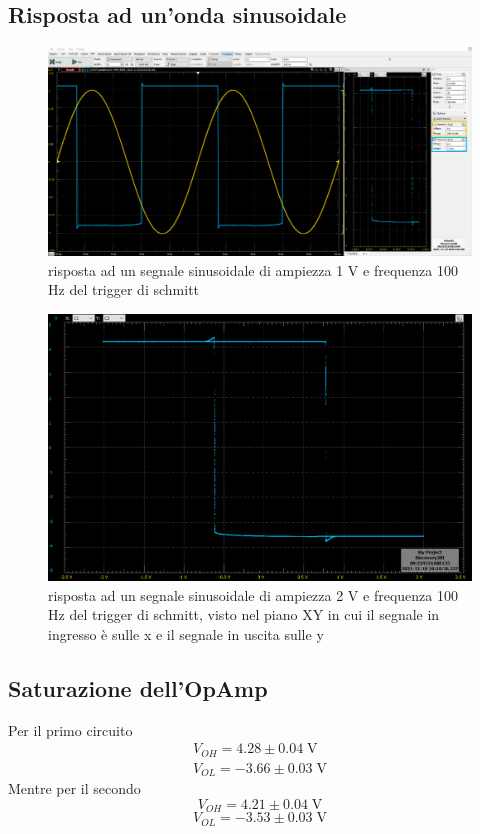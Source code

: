 \documentclass[10pt,a4paper]{article}
\begin{document}
\subsection{Risposta ad un'onda sinusoidale}

\begin{figure}[htbp]
\centering
\includegraphics[scale=0.335]{schmitt}
\caption{risposta ad un segnale sinusoidale di ampiezza 1 V e frequenza 100 Hz del trigger di schmitt}
\end{figure}

\begin{figure}[htbp]
\centering
\includegraphics[scale=0.4]{shmitt_isteresi}
\caption{risposta ad un segnale sinusoidale di ampiezza 2 V e frequenza 100 Hz del trigger di schmitt, visto nel piano XY in cui il segnale in ingresso è sulle x e il segnale in uscita sulle y}
\end{figure}


\subsection{Saturazione dell'OpAmp}
Per il primo circuito 
\begin{align*}
V_{OH} = 4.28 \pm 0.04 \; \si{\V} \\
V_{OL} = -3.66 \pm 0.03 \; \si{\V}
\end{align*}
Mentre per il secondo
\[
V_{OH} = 4.21 \pm 0.04 \; \si{\V}
\]
\[
V_{OL} = -3.53 \pm 0.03 \; \si{\V}
\]
\end{document}
